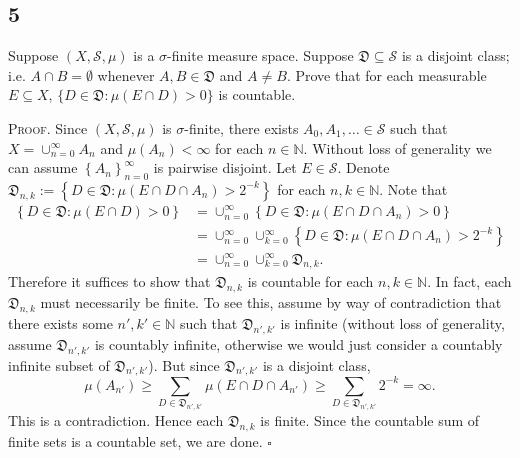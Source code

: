 \documentclass[12pt]{article}
\newcounter{ProofCounter}
\newenvironment{Proof}{\stepcounter{ProofCounter}\textsc{Proof.}}{\hfill$\square$}
\begin{document}
\subsection*{5}
\begin{tcolorbox}
Suppose $(X, \mathcal{S}, \mu)$ is a $\sigma$-finite measure space. Suppose $\mathfrak{D} \subseteq \mathcal{S}$ is a disjoint class; i.e. $A\cap B = \emptyset$
whenever $A, B \in \mathfrak{D}$ and $A \neq B$. Prove that for each measurable $E \subseteq X$, $\{D \in \mathfrak{D} : \mu(E\cap D) > 0\}$ is
countable.
\end{tcolorbox}

\begin{Proof}
Since $(X, \mathcal{S}, \mu)$ is $\sigma$-finite, there exists $A_{0}, A_{1}, \hdots \in \mathcal{S}$ such that $X = \cup_{n=0}^{\infty}A_{n}$ and
$\mu(A_{n}) < \infty$ for each $n \in \mathbb{N}$. Without loss of generality we can assume $\left\{ A_{n} \right\}_{n=0}^{\infty}$ is pairwise
disjoint. Let $E \in \mathcal{S}$. Denote $\mathfrak{D}_{n,k} := \left\{ D \in \mathfrak{D} : \mu(E\cap D\cap A_{n}) > 2^{-k} \right\}$ for each $n,k
\in \mathbb{N}$. Note that 
\begin{align*}
\left\{ D \in \mathfrak{D} : \mu(E \cap D) > 0 \right\} & = \cup_{n=0}^{\infty}\left\{ D \in \mathfrak{D} : \mu(E\cap D\cap A_{n}) > 0 \right\} \\
& = \cup_{n=0}^{\infty}\cup_{k=0}^{\infty}\left\{ D \in \mathfrak{D} : \mu(E\cap D\cap A_{n}) > 2^{-k} \right\} \\
& = \cup_{n=0}^{\infty}\cup_{k=0}^{\infty}\mathfrak{D}_{n,k}.
\end{align*}
Therefore it suffices to show that $\mathfrak{D}_{n,k}$ is countable for each $n,k \in \mathbb{N}$. In fact, each $\mathfrak{D}_{n,k}$ must
necessarily be finite. To see this, assume by way of contradiction that there exists some $n', k' \in \mathbb{N}$ such that $\mathfrak{D}_{n',k'}$ is
infinite (without loss of generality, assume $\mathfrak{D}_{n',k'}$ is countably infinite, otherwise we would just consider a countably infinite
subset of $\mathfrak{D}_{n',k'}$). But since $\mathfrak{D}_{n',k'}$ is a disjoint class, 
\[ \mu(A_{n'}) \geq \sum_{D\in \mathfrak{D}_{n',k'}}\mu(E\cap D\cap A_{n'}) \geq \sum_{D\in\mathfrak{D}_{n',k'}}2^{-k} = \infty. \]
This is a contradiction. Hence each $\mathfrak{D}_{n,k}$ is finite. Since the countable sum of finite sets is a countable set, we are done.
\end{Proof}
\end{document}

